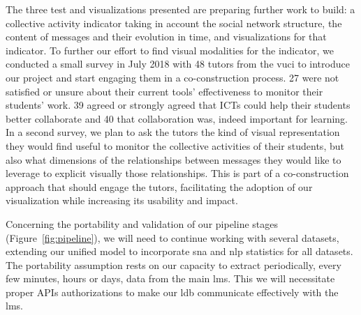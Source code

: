 \documentclass[a4paper,twoside]{article}
\begin{document}
The three test and visualizations presented are preparing further work to build:
a collective activity indicator taking in account the social network structure, the content of messages and their evolution in time, and visualizations for that indicator.
To further our effort to find visual modalities for the indicator, we conducted a small survey in July 2018 with 48 tutors from the \gls{vuci} to introduce our project and start engaging them in a co-construction process.   27 were not satisfied or unsure about their current tools' effectiveness to monitor their students' work.  39 agreed or strongly agreed that ICTs could help their students better collaborate and 40 that collaboration was, indeed important for learning.  In a second survey, we plan to ask the tutors the kind of visual representation they would find useful to monitor the collective activities of their students, but also what dimensions of the relationships between messages they would like to leverage to explicit visually those relationships.  This is part of a co-construction approach that should engage the tutors, facilitating the adoption of our visualization while increasing its usability and impact.

Concerning the portability and validation of our pipeline stages (Figure~\ref{fig:pipeline}), we will need to continue working with several datasets, extending our unified model to incorporate \gls{sna} and \gls{nlp} statistics for all datasets.  The portability assumption rests on our capacity to extract periodically, every few minutes, hours or days, data from the main \gls{lms}.  This we will necessitate proper APIs authorizations to make our \gls{ldb} communicate effectively with the \gls{lms}.

\end{document}
